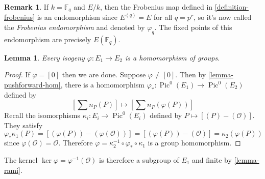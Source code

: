 \documentclass[12pt]{article}
\newtheorem{lemma}{Lemma}[subsection]
\theoremstyle{remark}
\theoremstyle{definition}
\newtheorem{remark}{Remark}[subsection]
\newtheorem{example}{Example}[subsection]
\newcommand{\F}[0]{\mathbb{F}}
\newcommand{\ecO}[0]{\mathcal O}
\newcommand{\kp}[0]{\kappa}
\newcommand{\comment}[1]{}
\newcommand{\Pic}[0]{\operatorname{Pic}}
\begin{document}
    \begin{remark}
        If $k=\F_q$ and $E/k$, then the Frobenius map defined in \autoref{definition-frobenius} is an endomorphism since $E^{(q)}=E$ for all $q=p^r$, so it's now called the \textit{Frobenius endomorphism} and denoted by $\varphi_q$. The fixed points of this endomorphism are precisely $E(\F_q)$.
    \end{remark}
    \comment{
    \begin{example}
        It might be interesting to present a ``visualization" of the Frobenius endomorphism on some cubic over finite fields. Take $k=\F_2$ and $K=\overline{\F_2}$ (all finite fields are perfect). We consider the subgroup $E(\F_{64})$. Note that we have intermediate fields with the following relation:
        \[\begin{tikzcd}
                                  & \mathbb F_{64} \arrow[ld, no head] \arrow[rd, no head] &                                 \\
\mathbb F_{8} \arrow[rd, no head] &                                                        & \mathbb F_4 \arrow[ld, no head] \\
                                  & \mathbb F_2                                            &                                
\end{tikzcd}\]
    \end{example}}
    \begin{lemma}\label{lemma-iso-hom}
        Every isogeny $\varphi:E_1\to E_2$ is a homomorphism of groups.
    \end{lemma}
    \begin{proof}
        If $\varphi=[0]$ then we are done. Suppose $\varphi\neq[0]$. Then by \autoref{lemma-pushforward-hom}, there is a homomorphism $\varphi_*:\Pic^0(E_1)\to\Pic^0(E_2)$ defined by
        \[\left[\sum n_P(P)\right]\mapsto\left[\sum n_P(\varphi(P))\right]\]
        Recall the isomorphisms $\kp_i:E_i\to \Pic^0(E_i)$ defined by $P\mapsto [(P)-(\ecO)]$. They satisfy
        \[\varphi_*\kp_1(P)=[(\varphi(P))-(\varphi(\ecO))]=[(\varphi(P))-(\ecO)]=\kp_2(\varphi(P))\]
        since $\varphi(\ecO)=\ecO$. Therefore $\varphi=\kp_2^{-1}\circ\varphi_*\circ\kp_1$ is a group homomorphism.
    \end{proof}
    \noindent The kernel $\ker\varphi=\varphi^{-1}(\ecO)$ is therefore a subgroup of $E_1$ and finite by \autoref{lemma-rami}.
    
\end{document}
